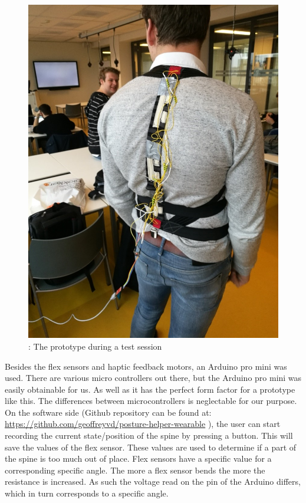 \documentclass[sigconf]{acmart}
\begin{document}
\begin{figure}[ht]
\centering
\includegraphics[scale=0.5]{Mattijs_Prototype.jpg}
\caption{: The prototype during a test session}
\end{figure}



Besides the flex sensors and haptic feedback motors, an Arduino pro mini was used. There are various micro controllers out there, but the Arduino pro mini was easily obtainable for us. As well as it has the perfect form factor for a prototype like this. The differences between microcontrollers is neglectable for our purpose.
On the software side (Github repository can be found at: \url{https://github.com/geoffreyvd/posture-helper-wearable} ), the user can start recording the current state/position of the spine by pressing a button. This will save the values of the flex sensor. These values are used to determine if a part of the spine is too much out of place. Flex sensors have a specific value for a corresponding specific angle. The more a flex sensor bends the more the resistance is increased. As such the voltage read on the pin of the Arduino differs, which in turn corresponds to a specific angle.
\end{document}
